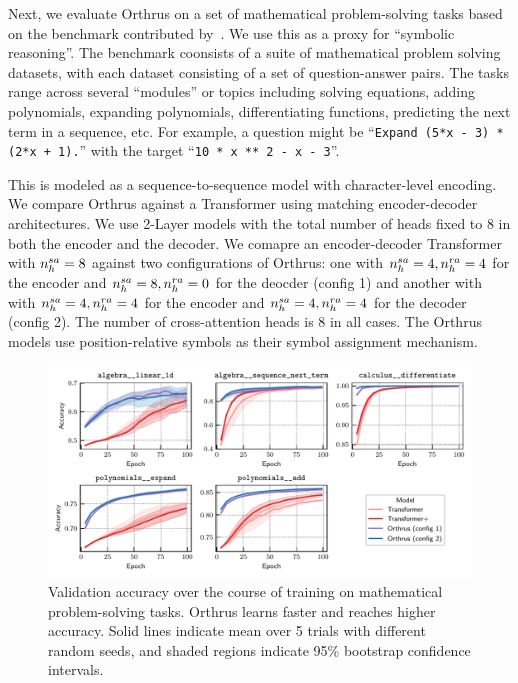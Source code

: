Next, we evaluate Orthrus on a set of mathematical problem-solving tasks based on the benchmark contributed by~\citet{saxtonAnalyzingMathematicalReasoning2019}. We use this as a proxy for ``symbolic reasoning''. The benchmark coonsists of a suite of mathematical problem solving datasets, with each dataset consisting of a set of question-answer pairs. The tasks range across several ``modules'' or topics including solving equations, adding polynomials, expanding polynomials, differentiating functions, predicting the next term in a sequence, etc. For example, a question might be ``\texttt{Expand (5*x - 3) * (2*x + 1).}'' with the target ``\texttt{10 * x ** 2 - x - 3}''.

This is modeled as a sequence-to-sequence model with character-level encoding. We compare Orthrus against a Transformer using matching encoder-decoder architectures. We use 2-Layer models with the total number of heads fixed to $8$ in both the encoder and the decoder. We comapre an encoder-decoder Transformer with $n_h^{sa} = 8$ against two configurations of Orthrus: one with $n_h^{sa} = 4, n_h^{ra} = 4$ for the encoder and $n_h^{sa} = 8, n_h^{ra} = 0$ for the deocder (config 1) and another with with $n_h^{sa} = 4, n_h^{ra} = 4$ for the encoder and $n_h^{sa} = 4, n_h^{ra} = 4$ for the decoder (config 2). The number of cross-attention heads is $8$ in all cases. The Orthrus models use position-relative symbols as their symbol assignment mechanism.

\begin{figure}
    \includegraphics[width=\textwidth]{figs/experiments/math/math_training_curves_interpolation.pdf}
    \caption{Validation accuracy over the course of training on mathematical problem-solving tasks. Orthrus learns faster and reaches higher accuracy. Solid lines indicate mean over 5 trials with different random seeds, and shaded regions indicate 95\% bootstrap confidence intervals.}\label{fig:math_training_curves_interpolation}
\end{figure}

